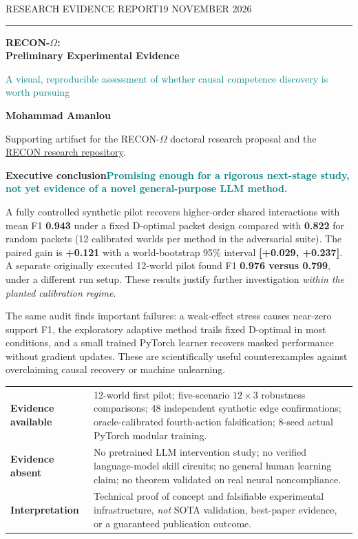 \documentclass[10.5pt,a4paper]{article}
\renewcommand\arraystretch{1.15}
\newcommand{\sig}[1]{\textcolor{teal}{\textbf{#1}}}
\begin{document}
\thispagestyle{plain}
{\sffamily\footnotesize RESEARCH EVIDENCE REPORT\hfill 19 NOVEMBER 2026}\par\vspace{3mm}\hrule height .8pt\vspace{6mm}
{\fontsize{23}{27}\selectfont\bfseries RECON-$\Omega$:\\ Preliminary Experimental Evidence\par}
\vspace{2mm}
{\large \textcolor{teal}{A visual, reproducible assessment of whether causal competence discovery is worth pursuing}\par}
\vspace{4mm}
{\large \textbf{Mohammad Amanlou}\par}
{\small Supporting artifact for the RECON-$\Omega$ doctoral research proposal and the \href{https://github.com/MohammadAmanlou/RECON}{RECON research repository}.\par}
\vspace{4mm}
\begin{resultbox}
\textbf{Executive conclusion}\quad \sig{Promising enough for a rigorous next-stage study, not yet evidence of a novel general-purpose LLM method.}

A fully controlled synthetic pilot recovers higher-order shared interactions with mean F1 \textbf{0.943} under a fixed D-optimal packet design compared with \textbf{0.822} for random packets (12 calibrated worlds per method in the adversarial suite). The paired gain is \textbf{+0.121} with a world-bootstrap 95\% interval \textbf{[+0.029, +0.237]}. A separate originally executed 12-world pilot found F1 \textbf{0.976 versus 0.799}, under a different run setup. These results justify further investigation \emph{within the planted calibration regime}.

The same audit finds important failures: a weak-effect stress causes near-zero support F1, the exploratory adaptive method trails fixed D-optimal in most conditions, and a small trained PyTorch learner recovers masked performance without gradient updates. These are scientifically useful counterexamples against overclaiming causal recovery or machine unlearning.
\end{resultbox}
\vspace{2mm}
\begin{center}\renewcommand\arraystretch{1.2}
\begin{tabularx}{\linewidth}{>{\bfseries\color{teal}}p{.24\linewidth}Y}
\toprule
Evidence available & 12-world first pilot; five-scenario $12\times 3$ robustness comparisons; 48 independent synthetic edge confirmations; oracle-calibrated fourth-action falsification; 8-seed actual PyTorch modular training.\\
Evidence absent & No pretrained LLM intervention study; no verified language-model skill circuits; no general human learning claim; no theorem validated on real neural noncompliance.\\
Interpretation & Technical proof of concept and falsifiable experimental infrastructure, \emph{not} SOTA validation, best-paper evidence, or a guaranteed publication outcome.\\
\bottomrule
\end{tabularx}
\end{center}
\end{document}
